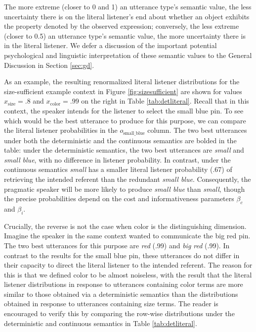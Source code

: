 \documentclass[11pt]{article}
\newcommand{\tableref}[1]{Table \ref{#1}}
\newcommand{\figref}[1]{Figure \ref{#1}}
\newcommand{\sectionref}[1]{Section \ref{#1}}
\begin{document}
The more extreme (closer to 0 and 1) an utterance type's semantic value, the less uncertainty there is on the literal listener's end about whether an object exhibits the property denoted by the observed expression; conversely, the less extreme (closer to 0.5) an utterance type's semantic value, the more uncertainty there is in the literal listener. We defer a discussion of the important potential psychological and linguistic interpretation of these semantic values to the General Discussion in \sectionref{sec:gd}.

As an example, the resulting renormalized literal listener distributions for the size-sufficient example context in \figref{fig:sizesufficient} are shown for values $x_{\text{size}} = .8$ and $x_{\text{color}} = .99$  on the right in \tableref{tab:detliteral}. Recall that in this context, the speaker intends for the listener to select the small blue pin. To see which would be the best utterance to produce for this purpose, we can compare the literal listener probabilities in the $o_{\text{small\_blue}}$ column. The two best utterances under both the deterministic and the continuous semantics are bolded in the table: under the deterministic semantics, the two best utterances are \emph{small} and \emph{small blue}, with no difference in listener probability. In contrast, under the continuous semantics \emph{small} has a smaller literal listener probability (.67) of retrieving the intended referent than the redundant \emph{small blue}. Consequently, the pragmatic speaker will be more likely to produce \emph{small blue} than \emph{small}, though the precise probabilities depend on the cost and informativeness parameters $\beta_c$ and $\beta_i$. 

Crucially, the reverse is not the case when color is the distinguishing dimension. Imagine the speaker in the same context wanted to communicate the big red pin. The two best utterances for this purpose are \emph{red} (.99) and \emph{big red} (.99). In contrast to the results for the small blue pin, these utterances do not differ in their capacity to direct the literal listener to the intended referent. The reason for this is that we defined color to be almost noiseless, with the result that the literal listener distributions in response to utterances containing color terms are more similar to those obtained via a deterministic semantics than the distributions obtained in response to utterances containing size terms. The reader is encouraged to verify this by comparing the row-wise distributions under the  deterministic and continuous semantics in \tableref{tab:detliteral}.
\end{document}
